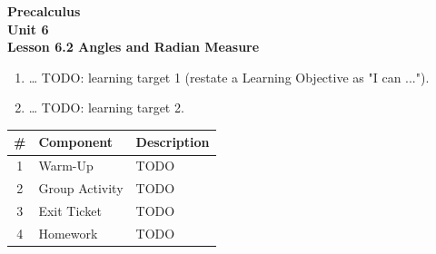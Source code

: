 \documentclass[10pt]{article}
\begin{document}
\vspace{-0.8in}

\begin{center}
  {\color{white}\textbf{\LARGE Precalculus}}\\[4pt]
  {\color{skymid}\large\textbf{Unit 6}}\\[6pt]
  {\color{white}\textbf{\large Lesson 6.2 \quad Angles and Radian Measure}}
\end{center}

\vspace{0.22in}
\namedateperiod
\vspace{0.18in}

\begin{learningtargetbox}
\small
\begin{enumerate}[leftmargin=1.5em, itemsep=5pt]
  \item \ldots{} TODO: learning target 1 (restate a Learning Objective as "I can ...").
  \item \ldots{} TODO: learning target 2.
\end{enumerate}
\end{learningtargetbox}

\vspace{0.14in}

\begin{tocbox}
\small
\renewcommand{\arraystretch}{1.5}
\begin{tabularx}{\linewidth}{@{} c l X @{}}
\rowcolor{sky}
\textbf{\#} & \textbf{Component} & \textbf{Description} \\
\midrule
1 & Warm-Up      & TODO \\
2 & Group Activity & TODO \\
3 & Exit Ticket  & TODO \\
4 & Homework     & TODO \\
\end{tabularx}
\end{tocbox}
\end{document}
